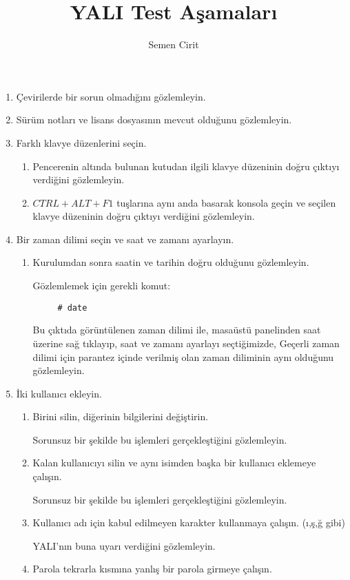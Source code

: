 \documentclass[a4paper,10pt]{article}
\title{YALI Test Aşamaları}
\author{Semen Cirit}
\begin{document}
\maketitle
\begin{enumerate}
\item Çevirilerde bir sorun olmadığını gözlemleyin.
\item Sürüm notları ve lisans dosyasının mevcut olduğunu gözlemleyin.
\item Farklı klavye düzenlerini seçin.
	\begin{enumerate}	
	\item Pencerenin altında bulunan kutudan ilgili klavye düzeninin doğru çıktıyı verdiğini gözlemleyin.

	\item $CTRL+ALT+F1$ tuşlarına aynı anda basarak konsola geçin ve seçilen klavye düzeninin doğru çıktıyı verdiğini gözlemleyin.
	\end{enumerate}
\item Bir zaman dilimi seçin ve saat ve zamanı ayarlayın.


    \begin{enumerate}
	\item Kurulumdan sonra saatin ve tarihin doğru olduğunu gözlemleyin.
	
	Gözlemlemek için gerekli komut:
	\begin{verbatim}
	 # date
	\end{verbatim}
	
	Bu çıktıda görüntülenen zaman dilimi ile, masaüstü panelinden saat üzerine sağ tıklayıp, saat ve zamanı ayarlayı seçtiğimizde, Geçerli zaman dilimi için parantez içinde verilmiş olan zaman diliminin aynı olduğunu gözlemleyin. 
        \end{enumerate}
\item İki kullanıcı ekleyin.
\begin{enumerate}
	\item Birini silin, diğerinin bilgilerini değiştirin.

	Sorunsuz bir şekilde bu işlemleri gerçekleştiğini gözlemleyin.
	\item Kalan kullanıcıyı silin ve aynı isimden başka bir kullanıcı eklemeye çalışın.

	Sorunsuz bir şekilde bu işlemleri gerçekleştiğini gözlemleyin.
	\item Kullanıcı adı için kabul edilmeyen karakter kullanmaya çalışın. (ı,ş,ğ gibi)
	
	YALI'nın buna uyarı verdiğini gözlemleyin.
	\item Parola tekrarla kısmına yanlış bir parola girmeye çalışın.


\end{enumerate}
\end{enumerate}
\end{document}

